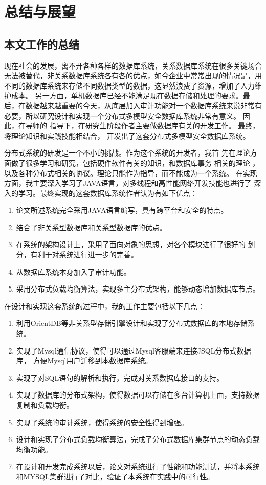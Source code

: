 \chapter{总结与展望}
\section{本文工作的总结}
现在社会的发展，离不开各种各样的数据库系统，关系数据库系统在很多关键场合无法被替代，非关系数据库系统各有各的优点，如今企业中常常出现的情况是，用不同的数据库系统来存储不同数据类型的数据，这显然浪费了资源，增加了人力维护成本。
另一方面，单机数据库已经不能满足现在数据存储和处理的要求。最后，在数据越来越重要的今天，从底层加入审计功能对一个数据库系统来说非常有必要，所以研究设计和实现一个分布式多模型安全数据库系统非常有意义。
因此，在导师的
指导下，在研究生阶段作者主要做数据库有关的开发工作。
最终，将理论知识和实践技能相结合，
开发出了这套分布式多模型安全数据库系统。

分布式系统的研发是一个不小的挑战。作为这个系统的开发者，我首
先在理论方面做了很多学习和研究，包括硬件软件有关的知识，和数据库事务
相关的理论
，以及各种分布式相关的协议。理论只能作为指导，而不能成为一个系统。
在实现方面，我主要深入学习了JAVA语言，对多线程和高性能网络开发技能也进行了
深入的学习。最终实现的这套数据库系统作者认为有如下优点：
\begin{enumerate}[fullwidth,itemindent=2em]
	\item 论文所述系统完全采用JAVA语言编写，具有跨平台和安全的特点。
	\item 结合了非关系型数据库和关系型数据库的优点。
	\item 在系统的架构设计上，采用了面向对象的思想，对各个模块进行了很好的
	划分，有利于对系统进行进一步的完善。
	\item 从数据库系统本身加入了审计功能。
	\item 采用分布式负载均衡算法，实现多主分布式架构，能够动态增加数据库节点。
\end{enumerate}

在设计和实现这套系统的过程中，我的工作主要包括以下几点：

\begin{enumerate}[fullwidth,itemindent=2em]
	\item 利用OrientDB等非关系型存储引擎设计和实现了分布式数据库的本地存储系统。
	\item 实现了Mysql通信协议，使得可以通过Mysql客服端来连接JSQL分布式数据库，
	方便Mysql用户迁移到本数据库系统。
	\item 实现了对SQL语句的解析和执行，完成对关系数据库接口的支持。
	\item 实现了数据库的分布式架构，使得数据可以存储在多台计算机上面，支持数据复制和负载均衡。
	\item 实现了系统的审计系统，使得系统的安全性得到增强。
	\item 设计和实现了分布式负载均衡算法，完成了分布式数据库集群节点的动态负载均衡功能。
	\item   在设计和开发完成系统以后，论文对系统进行了性能和功能测试，并将本系统和MYSQL集群进行了对比，验证了本系统在实践中的可行性。
\end{enumerate}
